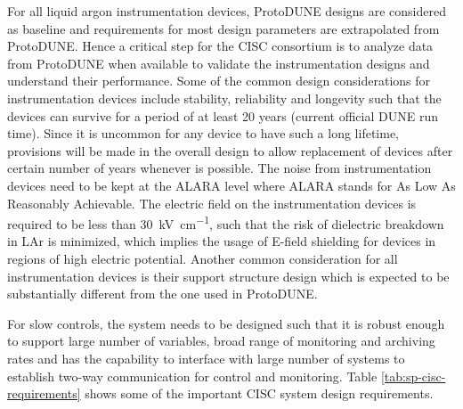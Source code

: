 For all liquid argon instrumentation devices, ProtoDUNE designs are
considered as baseline and requirements for most design
parameters are extrapolated from ProtoDUNE. Hence a critical step for
the CISC consortium is to analyze data from ProtoDUNE when available
to validate the instrumentation designs and understand their
performance. Some of the common design considerations for
instrumentation devices include stability, reliability and longevity
such that the devices can survive for a period of at least 20 years
(current official DUNE run time).  Since it is uncommon for any device
to have such a long lifetime, provisions will be made in the overall
design to allow replacement of devices after certain number of
years whenever is possible. The noise from instrumentation devices need to be kept at the
ALARA level where ALARA stands for As Low As Reasonably
Achievable. The electric field on the instrumentation devices is 
required to be less than \SI{30}{kV\per\cm},
such that the risk of dielectric breakdown in LAr is minimized, which implies 
the usage of E-field shielding for devices in regions of high electric potential. 
Another common consideration for all instrumentation devices is their support structure
design which is expected to be substantially different from the one used in ProtoDUNE.

For slow controls, the system needs to be designed such that it is
robust enough to support large number of variables, broad range of
monitoring and archiving rates and has the capability to interface
with large number of systems to establish two-way communication for
control and monitoring. Table \ref{tab:sp-cisc-requirements} shows
some of the important CISC system design requirements.


